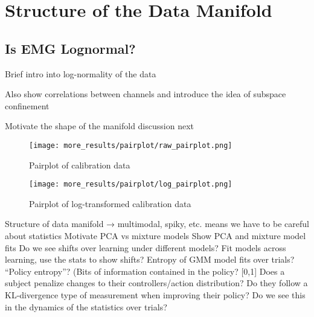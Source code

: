 \documentclass[../main.tex]{subfiles}
\begin{document}


\section{Structure of the Data Manifold}


\subsection{Is EMG Lognormal?}

Brief intro into log-normality of the data

Also show correlations between channels and introduce the idea of subspace confinement

Motivate the shape of the manifold discussion next

\begin{figure}[H]
    \centering
    \texttt{[image: more\_results/pairplot/raw\_pairplot.png]}
    \caption[Pairplot of calibration data]{Pairplot of calibration data}\label{fig:raw_pairplot}
\end{figure}

\begin{figure}[H]
    \centering
    \texttt{[image: more\_results/pairplot/log\_pairplot.png]}
    \caption[Pairplot of log-transformed calibration data]{Pairplot of log-transformed calibration data}\label{fig:log_pairplot}
\end{figure}




Structure of data manifold → multimodal, spiky, etc. means we have to be careful about statistics
	Motivate PCA vs mixture models
	Show PCA and mixture model fits
Do we see shifts over learning under different models?
	Fit models across learning, use the stats to show shifts?
Entropy of GMM model fits over trials? “Policy entropy”? (Bits of information contained in the policy? [0,1] %
Does a subject penalize changes to their controllers/action distribution? Do they follow a KL-divergence type of measurement when improving their policy? Do we see this in the dynamics of the statistics over trials?
\end{document}
